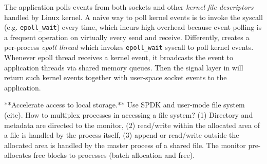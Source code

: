 The application polls events from both sockets and other \textit{kernel file descriptors} handled by Linux kernel.
A naive way to poll kernel events is to invoke the syscall (e.g. \texttt{epoll\_wait}) every time, which incurs high overhead because event polling is a frequent operation on virtually every send and receive.
Differently, \libipc{} creates a per-process \textit{epoll thread} which invokes \texttt{epoll\_wait} syscall to poll kernel events. Whenever epoll thread receives a kernel event, it broadcasts the event to application threads via shared memory queues. Then the signal layer in \libipc{} will return such kernel events together with user-space socket events to the application.

**Accelerate access to local storage.**
Use SPDK and user-mode file system (cite). How to multiplex processes in accessing a file system? (1) Directory and metadata are directed to the monitor, (2) read/write within the allocated area of a file is handled by the process itself, (3) append or read/write outside the allocated area is handled by the master process of a shared file. The monitor pre-allocates free blocks to processes (batch allocation and free).

